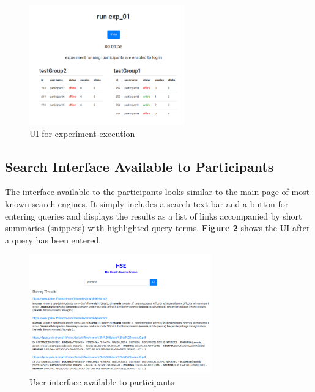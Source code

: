 \documentclass[a4paper]{usiinfbachelorproject}
\begin{document}
\begin{figure} [h]
\centering
\includegraphics[width=0.6\textwidth]{figures/run}
\caption{UI for experiment execution}
\label{fig:run}
\end{figure}

\subsection{Search Interface Available to Participants} \label{sec:designSearchUi}

The interface available to the participants looks similar to the main page of most known search engines. It simply
includes a search text bar and a button for entering queries and displays the results as a list of
links accompanied by short summaries (snippets) with highlighted query terms. 
\textbf{Figure \ref{fig:searchUi}} shows the UI after a query has been entered.

\begin{figure} [h]
\centering
\includegraphics[width=0.7\textwidth]{figures/searchUi}
\caption{User interface available to participants}
\label{fig:searchUi}
\end{figure}


\end{document}
